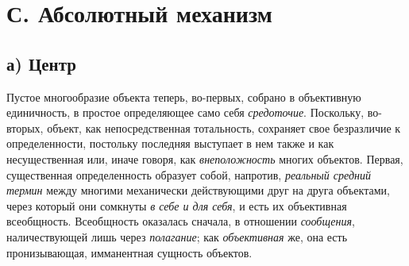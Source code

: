 {{\section[С. Абсолютный механизм]{С. Абсолютный механизм}
\subsection[а) Центр]{а) Центр}
Пустое многообразие объекта теперь, во-первых, собрано в
объективную единичность, в простое определяющее само себя
{\em средоточие}.
Поскольку, во-вторых, объект, как непосредственная
тотальность, сохраняет свое безразличие к определенности, постольку
последняя выступает в нем также и как несущественная или, иначе говоря, как
{\em внеположность}
многих объектов. Первая, существенная определенность образует
собой, напротив, {\em реальный средний
термин} между многими механически действующими друг на друга
объектами, через который они сомкнуты
{\em в себе и для себя},
и есть их объективная всеобщность. Всеобщность оказалась
сначала, в отношении {\em сообщения},
наличествующей лишь через
{\em полагание}; как
{\em объективная} же, она
есть пронизывающая, имманентная сущность объектов.

}}
